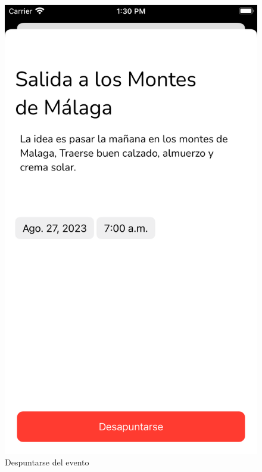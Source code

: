 \begin{appendices}
\begin{figure}[H]
\begin{minipage}{0.3\textwidth}
            \includegraphics[cframe=black 2pt,width=1\linewidth]{images/manual/desapuntarse.png}
        \end{minipage}
        \caption{Despuntarse del evento}
        \label{fig:leave_event}
\end{figure}
\end{appendices}